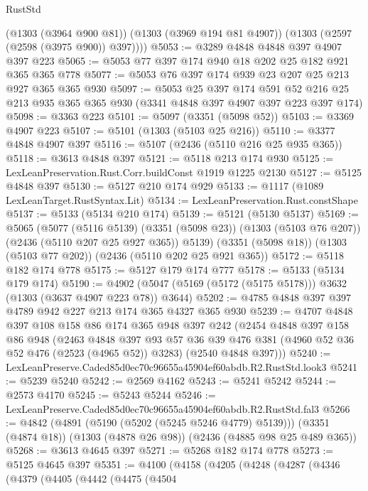 \begin{lexlean}{RustStd}
\begin{coremodule}
        (@1303 (@3964 @900 @81))
        (@1303 (@3969 @194 @81 @4907))
        (@1303 (@2597 (@2598 (@3975 @900)) @397))))
@5053 := @3289 @4848 @4848 @397 @4907 @397 @223
@5065 := @5053 @77 @397 @174 @940 @18 @202 @25 @182 @921 @365 @365 @778
@5077 := @5053 @76 @397 @174 @939 @23 @207 @25 @213 @927 @365 @365 @930
@5097 := @5053
    @25
    @397
    @174
    @591
    @52
    @216
    @25
    @213
    @935
    @365
    @365
    @930
    (@3341 @4848 @397 @4907 @397 @223 @397 @174)
@5098 := @3363 @223
@5101 := @5097 (@3351 (@5098 @52))
@5103 := @3369 @4907 @223
@5107 := @5101 (@1303 (@5103 @25 @216))
@5110 := @3377 @4848 @4907 @397
@5116 := @5107 (@2436 (@5110 @216 @25 @935 @365))
@5118 := @3613 @4848 @397
@5121 := @5118 @213 @174 @930
@5125 := LexLeanPreservation.Rust.Corr.buildConst @1919 @1225 @2130
@5127 := @5125 @4848 @397
@5130 := @5127 @210 @174 @929
@5133 := @1117 (@1089 LexLeanTarget.RustSyntax.Lit)
@5134 := LexLeanPreservation.Rust.constShape
@5137 := @5133 (@5134 @210 @174)
@5139 := @5121 (@5130 @5137)
@5169 := @5065
    (@5077
      (@5116 @5139)
      (@3351 (@5098 @23))
      (@1303 (@5103 @76 @207))
      (@2436 (@5110 @207 @25 @927 @365))
      @5139)
    (@3351 (@5098 @18))
    (@1303 (@5103 @77 @202))
    (@2436 (@5110 @202 @25 @921 @365))
@5172 := @5118 @182 @174 @778
@5175 := @5127 @179 @174 @777
@5178 := @5133 (@5134 @179 @174)
@5190 := @4902 (@5047 (@5169 (@5172 (@5175 @5178))) @3632 (@1303 (@3637 @4907 @223 @78)) @3644)
@5202 := @4785 @4848 @397 @397 @4789 @942 @227 @213 @174 @365 @4327 @365 @930
@5239 := @4707
    @4848
    @397
    @108
    @158
    @86
    @174
    @365
    @948
    @397
    @242
    (@2454
      @4848
      @397
      @158
      @86
      @948
      (@2463
        @4848
        @397
        @93
        @57
        @36
        @39
        @476
        @381
        (@4960 @52 @36 @52 @476 (@2523 (@4965 @52)) @3283)
        (@2540 @4848 @397)))
@5240 := LexLeanPreserve.Caded85d0ec70c96655a45904ef60abdb.R2.RustStd.look3
@5241 := @5239 @5240
@5242 := @2569 @4162
@5243 := @5241 @5242
@5244 := @2573 @4170
@5245 := @5243 @5244
@5246 := LexLeanPreserve.Caded85d0ec70c96655a45904ef60abdb.R2.RustStd.fal3
@5266 := @4842
    (@4891 (@5190 (@5202 (@5245 @5246 @4779) @5139)))
    (@3351 (@4874 @18))
    (@1303 (@4878 @26 @98))
    (@2436 (@4885 @98 @25 @489 @365))
@5268 := @3613 @4645 @397
@5271 := @5268 @182 @174 @778
@5273 := @5125 @4645 @397
@5351 := @4100
    (@4158
      (@4205
        (@4248
          (@4287
            (@4346
              (@4379
                (@4405
                  (@4442
                    (@4475
                      (@4504

\end{coremodule}
\end{lexlean}
